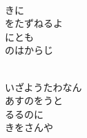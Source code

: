 \documentclass[10pt,b5j]{tarticle} %
\begin{document}
\begin{enumerate}
\begin{minipage}[c]{\blocksize}
    \end{minipage}
    \begin{minipage}[c]{\blocksize}
        
        \vspace{\linespace}
        \item~\\
        きに\\
        をたずねるよ\\
        にとも\\
        のはからじ
        
    \end{minipage}
    \begin{minipage}[c]{\blocksize}
        
        \vspace{\linespace}
        \item~\\
        いざようたわなん\\
        あすのをうと\\
        るるのに\\
        きをさんや
    
    \end{minipage}
\end{enumerate} %
\end{document}
